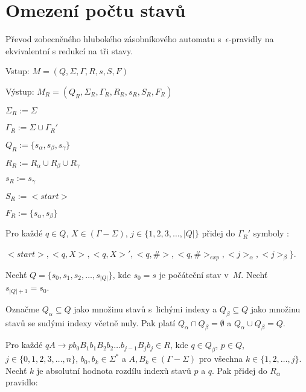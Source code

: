 
\section{Omezení počtu stavů}


\begin{Alg}
Převod zobecněného hlubokého zásobníkového automatu s~$\epsilon$-pravidly na ekvivalentní s redukcí na tři stavy.

\begin{list}{}{\setlength\parsep{0cm} \setlength\itemsep{0cm} \setlength\leftmargin{1em}}
   \item Vstup: $M = (Q,\Sigma,\Gamma, R, s, S, F)$ 
   \item Výstup: $M_{R} = (Q_{R}, \Sigma_{R}, {\Gamma}_{R}, R_{R}, s_{R},  S_{R}, F_{R})$ \medskip
    
   \item ${\Sigma}_{R} := \Sigma$
   \item ${\Gamma}_{R} := \Sigma \cup {\Gamma}_{R}'$
   \item $Q_{R} := \{s_\alpha, s_\beta, s_\gamma \}$
   \item $R_{R} := R_{\alpha} \cup R_{\beta} \cup R_{\gamma}$
   \item $s_{R} := s_{\gamma} $
   \item $S_{R} := <start> $
   \item $F_{R} := \{s_{\alpha}, s_{\beta}\} $ \medskip

   \item Pro každé $q \in Q$, $X \in (\Gamma - \Sigma)$, $j \in \{1,2,3,\dots,|Q|\}$ přidej do ${\Gamma}_{R}'$ symboly :
   \item $<start>, <q, X>, <q, X>', <q, \#>, <q, \#>_{exp}, <j>_\alpha, <j>_\beta \}$.\medskip

   \item Nechť $Q = \{s_0, s_1, s_2, \dots,s_{|Q|}\}$, kde $s_0 = s$ je počáteční stav v~$M$. Nechť $s_{|Q|+1} = s_0$.
   \item Označme $Q_\alpha \subseteq Q$ jako množinu stavů s~lichými indexy a $Q_\beta \subseteq Q$ jako množinu stavů se sudými indexy včetně nuly.
         Pak platí $Q_\alpha \cap Q_\beta = \emptyset$ a  $Q_\alpha \cup Q_\beta = Q$.\medskip

   \item Pro každé $qA \rightarrow p b_0 B_1 b_1 B_2 b_2 \dots b_{j-1} B_{j} b_j \in R$, kde $q \in Q_\beta$, $p \in Q$, $j \in \{0,1,2,3,\dots,n\}$, $b_0,b_k \in {\Sigma}^*$ a $A, B_k \in (\Gamma - \Sigma)$ pro všechna $k \in \{1,2,\dots,j\}$. 
         Nechť $k$ je absolutní hodnota rozdílu indexů stavů $p$ a $q$. 
         Pak přidej do $R_\alpha$ pravidlo:



\end{list}
\end{Alg}
